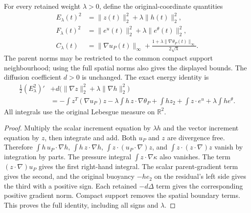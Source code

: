 For every retained weight $\lambda>0$, define the original-coordinate
quantities
\begin{align}
 E_\lambda(t)^2&=\|z(t)\|_2^2+\lambda\|h(t)\|_2^2,\nonumber\\
 F_\lambda(t)^2&=\|e^u(t)\|_2^2+\lambda\|e^\theta(t)\|_2^2,\nonumber\\
 C_\lambda(t)&=\|\nabla u_P(t)\|_\infty+
             \frac{1+\lambda\|\nabla\theta_P(t)\|_\infty}
                  {2\sqrt\lambda}.
 \label{cvlane:ifr:weighted-data}
\end{align}
The parent norms may be restricted to the common compact support
neighbourhood; using the full spatial norms also gives the displayed
bounds.  The diffusion coefficient $d>0$ is unchanged.
The exact energy identity is
\begin{align}
 \frac12(E_\lambda^2)'&
   +d\bigl(\|\nabla z\|_2^2+\lambda\|\nabla h\|_2^2\bigr)\nonumber\\
 &= -\int z^T(\nabla u_P)z
    -\lambda\int h\,z\cdot\nabla\theta_P
    +\int h z_2
    +\int z\cdot e^u+\lambda\int h e^\theta .
 \label{cvlane:ifr:energy-identity}
\end{align}
All integrals use the original Lebesgue measure on $\mathbb R^2$.

\begin{proof}
Multiply the scalar increment equation by $\lambda h$ and the vector
increment equation by $z$, then integrate and add.
Both $u_P$ and $z$ are divergence free.  Therefore
$\int h\,u_P\cdot\nabla h$, $\int h\,z\cdot\nabla h$,
$\int z\cdot(u_P\cdot\nabla)z$, and
$\int z\cdot(z\cdot\nabla)z$ vanish by integration by parts.
The pressure integral $\int z\cdot\nabla\kappa$ also vanishes.
The term $(z\cdot\nabla)u_P$ gives the first right-hand integral.
The scalar parent-gradient term gives the second, and the original
buoyancy $-he_2$ on the residual's left side gives the third with a
positive sign.  Each retained $-d\Delta$ term gives the corresponding
positive gradient norm.  Compact support removes the spatial boundary
terms.  This proves the full identity, including all signs and $\lambda$.
\end{proof}

